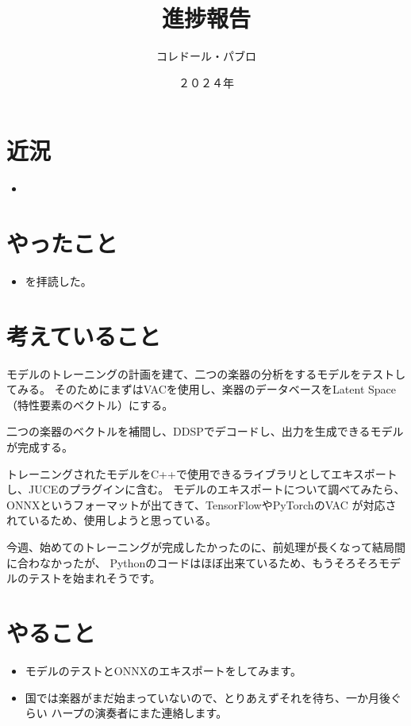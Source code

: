 \documentclass[a4paper, 12pt]{article}
\title{進捗報告}
\author{コレドール・パブロ}
\date{２０２４年}
\begin{document}
\maketitle

\section*{近況}
\begin{itemize}
    \item 
\end{itemize} 

\section*{やったこと}
\begin{itemize}
    \item \cite{latentSpaceInterpolation}を拝読した。
\end{itemize}

\section*{考えていること}

モデルのトレーニングの計画を建て、二つの楽器の分析をするモデルをテストしてみる。
そのためにまずはVACを使用し、楽器のデータベースをLatent Space（特性要素のベクトル）にする。\cite{latent_space}

二つの楽器のベクトルを補間し、DDSPでデコードし、出力を生成できるモデルが完成する。

トレーニングされたモデルをC++で使用できるライブラリとしてエキスポートし、JUCEのプラグインに含む。
モデルのエキスポートについて調べてみたら、ONNXというフォーマットが出てきて、TensorFlowやPyTorchのVAC
が対応されているため、使用しようと思っている。

今週、始めてのトレーニングが完成したかったのに、前処理が長くなって結局間に合わなかったが、
Pythonのコードはほぼ出来ているため、もうそろそろモデルのテストを始まれそうです。

\section*{やること}
\begin{itemize}
    \item モデルのテストとONNXのエキスポートをしてみます。
    \item 国では楽器がまだ始まっていないので、とりあえずそれを待ち、一か月後ぐらい
    ハープの演奏者にまた連絡します。
\end{itemize}



\end{document}
